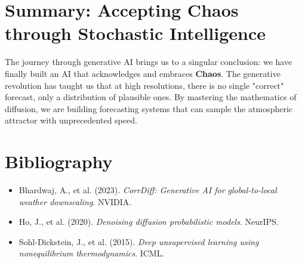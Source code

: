 \section{Summary: Accepting Chaos through Stochastic Intelligence}

The journey through generative AI brings us to a singular conclusion: we have finally built an AI that acknowledges and embraces \textbf{Chaos}. The generative revolution has taught us that at high resolutions, there is no single "correct" forecast, only a distribution of plausible ones. By mastering the mathematics of diffusion, we are building forecasting systems that can sample the atmospheric attractor with unprecedented speed.

\section*{Bibliography}
\begin{itemize}
    \item Bhardwaj, A., et al. (2023). \textit{CorrDiff: Generative AI for global-to-local weather downscaling}. NVIDIA.
    \item Ho, J., et al. (2020). \textit{Denoising diffusion probabilistic models}. NeurIPS.
    \item Sohl-Dickstein, J., et al. (2015). \textit{Deep unsupervised learning using nonequilibrium thermodynamics}. ICML.
\end{itemize}
